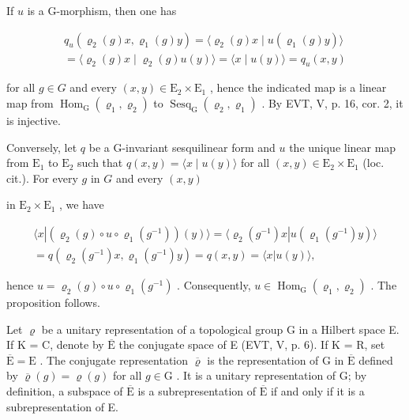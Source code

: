 If \(u\) is a G-morphism, then one has

\[
\begin{array}{c} q _ {u} (\varrho_ {2} (g) x, \varrho_ {1} (g) y) = \langle \varrho_ {2} (g) x \mid u (\varrho_ {1} (g)y) \rangle \\ = \langle \varrho_ {2} (g) x \mid \varrho_ {2} (g) u (y) \rangle = \langle x \mid u (y) \rangle = q _ {u} (x, y) \end{array}
\]

for all \(g \in G\) and every \((x, y) \in \mathrm{E}_{2} \times \mathrm{E}_{1}\) , hence the indicated map is a linear map from \(\operatorname{Hom}_{\mathrm{G}}(\varrho_{1}, \varrho_{2})\) to \(\operatorname{Sesq}_{\mathrm{G}}(\varrho_{2}, \varrho_{1})\) . By EVT, V, p. 16, cor. 2, it is injective.

Conversely, let \(q\) be a G-invariant sesquilinear form and \(u\) the unique linear map from \(\mathrm{E}_1\) to \(\mathrm{E}_2\) such that \(q(x,y) = \langle x \mid u(y) \rangle\) for all \((x,y) \in \mathrm{E}_2 \times \mathrm{E}_1\) (loc. cit.). For every \(g\) in \(G\) and every \((x,y)\)

in \(\mathrm{E}_2\times \mathrm{E}_1\) , we have

\[
\begin{array}{c} \langle x | (\varrho_ {2} (g) \circ u \circ \varrho_ {1} (g ^ {- 1})) (y) \rangle = \langle \varrho_ {2} (g ^ {- 1}) x | u (\varrho_ {1} (g ^ {- 1}) y) \rangle \\ = q (\varrho_ {2} (g ^ {- 1}) x, \varrho_ {1} (g ^ {- 1}) y) = q (x, y) = \langle x | u (y) \rangle , \end{array}
\]

hence \(u = \varrho_{2}(g) \circ u \circ \varrho_{1}(g^{-1})\) . Consequently, \(u \in \operatorname{Hom}_{\mathrm{G}}(\varrho_{1}, \varrho_{2})\) . The proposition follows.

Let \(\varrho\) be a unitary representation of a topological group G in a Hilbert space E. If K = C, denote by \(\overline{\mathrm{E}}\) the conjugate space of E (EVT, V, p. 6). If K = R, set \(\overline{\mathrm{E}} = \mathrm{E}\) . The conjugate representation \(\overline{\varrho}\) is the representation of G in \(\overline{\mathrm{E}}\) defined by \(\overline{\varrho}(g) = \varrho(g)\) for all \(g \in \mathrm{G}\) . It is a unitary representation of G; by definition, a subspace of \(\overline{\mathrm{E}}\) is a subrepresentation of \(\overline{\mathrm{E}}\) if and only if it is a subrepresentation of E.

